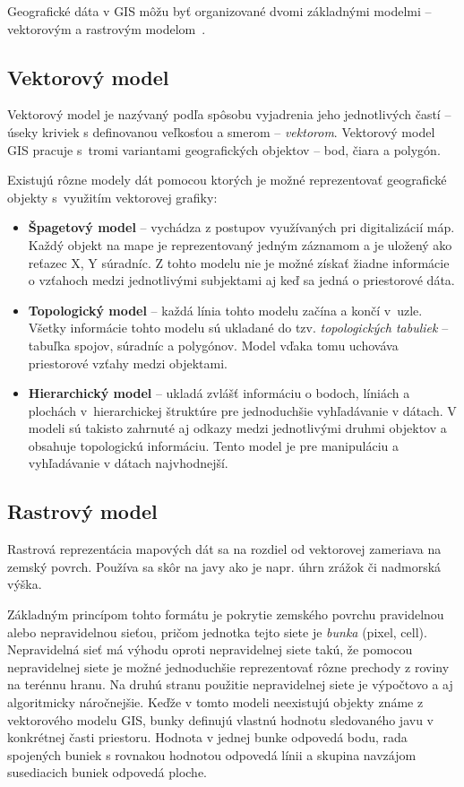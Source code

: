Geografické dáta v GIS môžu byť organizované dvomi základnými modelmi \--- vektorovým a rastrovým modelom~\cite{holman2014priestorovedata}.

\subsection*{Vektorový model}
Vektorový model je nazývaný podľa spôsobu vyjadrenia jeho jednotlivých častí \--- úseky kriviek s definovanou veľkosťou a smerom \--- \emph{vektorom}. Vektorový model GIS pracuje s~tromi variantami geografických objektov \--- bod, čiara a polygón.

Existujú rôzne modely dát pomocou ktorých je možné reprezentovať geografické objekty s~využitím vektorovej grafiky:
\begin{itemize}
    \item \textbf{Špagetový model} \--- vychádza z postupov využívaných pri digitalizácií máp. Každý objekt na mape je reprezentovaný jedným záznamom a je uložený ako reťazec X, Y súradníc. Z tohto modelu nie je možné získať žiadne informácie o vzťahoch medzi jednotlivými subjektami aj keď sa jedná o priestorové dáta.
    \item \textbf{Topologický model} \--- každá línia tohto modelu začína a končí v~uzle. Všetky informácie tohto modelu sú ukladané do tzv. \emph{topologických tabuliek} \--- tabuľka spojov, súradníc a polygónov. Model vďaka tomu uchováva priestorové vzťahy medzi objektami.
    \item \textbf{Hierarchický model} \--- ukladá zvlášť informáciu o bodoch, líniách a plochách v~hierarchickej štruktúre pre jednoduchšie vyhľadávanie v dátach. V modeli sú takisto zahrnuté aj odkazy medzi jednotlivými druhmi objektov a obsahuje topologickú informáciu. Tento model je pre manipuláciu a vyhľadávanie v dátach najvhodnejší.
\end{itemize}

\subsection*{Rastrový model}
Rastrová reprezentácia mapových dát sa na rozdiel od vektorovej zameriava na zemský povrch. Používa sa skôr na javy ako je napr. úhrn zrážok či nadmorská výška.

Základným princípom tohto formátu je pokrytie zemského povrchu pravidelnou alebo nepravidelnou sieťou, pričom jednotka tejto siete je \emph{bunka} (pixel, cell). Nepravidelná sieť má výhodu oproti nepravidelnej siete takú, že pomocou nepravidelnej siete je možné jednoduchšie reprezentovať rôzne prechody z roviny na terénnu hranu. Na druhú stranu použitie nepravidelnej siete je výpočtovo a aj algoritmicky náročnejšie. Keďže v tomto modeli neexistujú objekty známe z vektorového modelu GIS, bunky definujú vlastnú hodnotu sledovaného javu v konkrétnej časti priestoru. Hodnota v jednej bunke odpovedá bodu, rada spojených buniek s rovnakou hodnotou odpovedá línii a skupina navzájom susediacich buniek odpovedá ploche.

